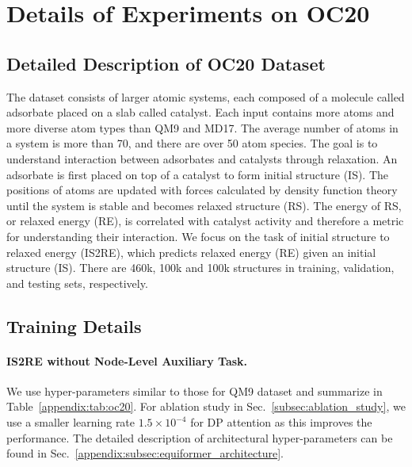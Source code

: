 \section{Details of Experiments on OC20}
\label{appendix:sec:oc20}


\subsection{Detailed Description of OC20 Dataset}
\label{appendix:subsec:oc20_dataset_details}
The dataset consists of larger atomic systems, each composed of a molecule called adsorbate placed on a slab called catalyst.
Each input contains more atoms and more diverse atom types than QM9 and MD17.
The average number of atoms in a system is more than 70, and there are over 50 atom species.
The goal is to understand interaction between adsorbates and catalysts through relaxation.
An adsorbate is first placed on top of a catalyst to form initial structure (IS).
The positions of atoms are updated with forces calculated by density function theory until the system is stable and becomes relaxed structure (RS).
The energy of RS, or relaxed energy (RE), is correlated with catalyst activity and therefore a metric for understanding their interaction.
We focus on the task of initial structure to relaxed energy (IS2RE), which predicts relaxed energy (RE) given an initial structure (IS).
There are 460k, 100k and 100k structures in training, validation, and testing sets, respectively.



\subsection{Training Details}
\label{appendix:subsec:oc20_training_details}
\paragraph{IS2RE without Node-Level Auxiliary Task.}
We use hyper-parameters similar to those for QM9 dataset and summarize in Table~\ref{appendix:tab:oc20}.
For ablation study in Sec.~\ref{subsec:ablation_study}, we use a smaller learning rate $1.5 \times 10 ^{-4}$ for DP attention as this improves the performance.
The detailed description of architectural hyper-parameters can be found in Sec.~\ref{appendix:subsec:equiformer_architecture}. 

